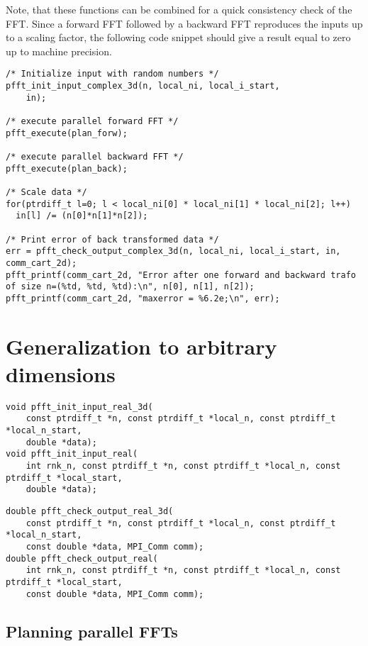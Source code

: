 Note, that these functions can be combined for a quick consistency check of the FFT.
Since a forward FFT followed by a backward FFT reproduces the inputs up to a scaling factor, the following code snippet should give a result equal to zero up to machine precision.
\begin{lstlisting}
/* Initialize input with random numbers */
pfft_init_input_complex_3d(n, local_ni, local_i_start,
    in);

/* execute parallel forward FFT */
pfft_execute(plan_forw);

/* execute parallel backward FFT */
pfft_execute(plan_back);

/* Scale data */
for(ptrdiff_t l=0; l < local_ni[0] * local_ni[1] * local_ni[2]; l++)
  in[l] /= (n[0]*n[1]*n[2]);

/* Print error of back transformed data */
err = pfft_check_output_complex_3d(n, local_ni, local_i_start, in, comm_cart_2d);
pfft_printf(comm_cart_2d, "Error after one forward and backward trafo of size n=(%td, %td, %td):\n", n[0], n[1], n[2]);
pfft_printf(comm_cart_2d, "maxerror = %6.2e;\n", err);
\end{lstlisting}




\section{Generalization to arbitrary dimensions}

\begin{lstlisting}
void pfft_init_input_real_3d(
    const ptrdiff_t *n, const ptrdiff_t *local_n, const ptrdiff_t *local_n_start,
    double *data);
void pfft_init_input_real(
    int rnk_n, const ptrdiff_t *n, const ptrdiff_t *local_n, const ptrdiff_t *local_start,
    double *data);
\end{lstlisting}

\begin{lstlisting}
double pfft_check_output_real_3d(
    const ptrdiff_t *n, const ptrdiff_t *local_n, const ptrdiff_t *local_n_start,
    const double *data, MPI_Comm comm);
double pfft_check_output_real(
    int rnk_n, const ptrdiff_t *n, const ptrdiff_t *local_n, const ptrdiff_t *local_start,
    const double *data, MPI_Comm comm);
\end{lstlisting}


\subsection{Planning parallel FFTs}

